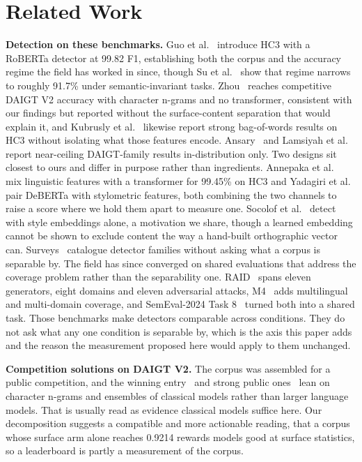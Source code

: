 \section{Related Work}
\label{sec:related}

\textbf{Detection on these benchmarks.} Guo et al.~\cite{Guo2023close} introduce HC3 with a RoBERTa detector at 99.82 F1, establishing both the corpus and the accuracy regime the field has worked in since, though Su et al.~\cite{Su2023plus} show that regime narrows to roughly 91.7\% under semantic-invariant tasks. Zhou~\cite{Zhou2024exploiting} reaches competitive DAIGT V2 accuracy with character n-grams and no transformer, consistent with our findings but reported without the surface-content separation that would explain it, and Kubrusly et al.~\cite{Kubrusly2025detecting} likewise report strong bag-of-words results on HC3 without isolating what those features encode. Ansary~\cite{Ansary2026multirepresentation} and Lamsiyah et al.~\cite{Lamsiyah2025daigt} report near-ceiling DAIGT-family results in-distribution only. Two designs sit closest to ours and differ in purpose rather than ingredients. Annepaka et al.~\cite{Annepaka2026synergizing} mix linguistic features with a transformer for 99.45\% on HC3 and Yadagiri et al.~\cite{Yadagiri2025aigenerated} pair DeBERTa with stylometric features, both combining the two channels to raise a score where we hold them apart to measure one. Socolof et al.~\cite{Socolof2024style} detect with style embeddings alone, a motivation we share, though a learned embedding cannot be shown to exclude content the way a hand-built orthographic vector can. Surveys~\cite{Crothers2023machine} catalogue detector families without asking what a corpus is separable by. The field has since converged on shared evaluations that address the coverage problem rather than the separability one. RAID~\cite{Dugan2024raid} spans eleven generators, eight domains and eleven adversarial attacks, M4~\cite{Wang2024m4} adds multilingual and multi-domain coverage, and SemEval-2024 Task 8~\cite{Wang2024semeval} turned both into a shared task. Those benchmarks make detectors comparable across conditions. They do not ask what any one condition is separable by, which is the axis this paper adds and the reason the measurement proposed here would apply to them unchanged.

\textbf{Competition solutions on DAIGT V2.} The corpus was assembled for a public competition, and the winning entry~\cite{Biswas2024kaggle} and strong public ones~\cite{Zeyadusf2024catch,Zain2025multi,Neo2024didai} lean on character n-grams and ensembles of classical models rather than larger language models. That is usually read as evidence classical models suffice here. Our decomposition suggests a compatible and more actionable reading, that a corpus whose surface arm alone reaches 0.9214 rewards models good at surface statistics, so a leaderboard is partly a measurement of the corpus.

